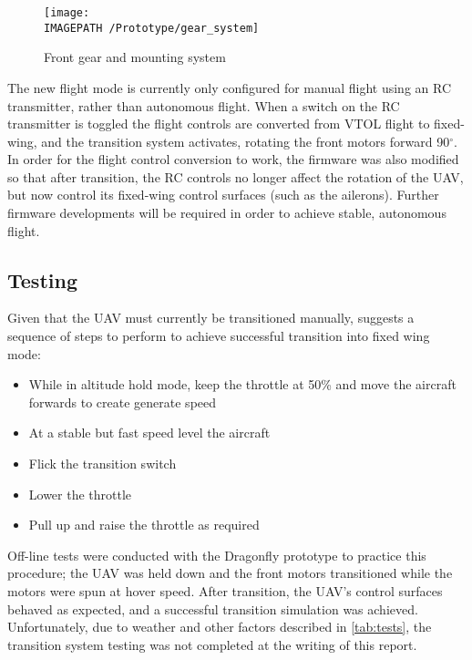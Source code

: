\begin{figure}[!ht]
	\centering
	\texttt{[image: \\IMAGEPATH /Prototype/gear\_system]}
	\caption{Front gear and mounting system}
	\label{fig:gearsys}
\end{figure}

The new flight mode is currently only configured for manual flight using an RC transmitter, rather than autonomous flight. When a switch on the RC transmitter is toggled the flight controls are converted from VTOL flight to fixed-wing, and the transition system activates, rotating the front motors forward 90$^\circ$. In order for the flight control conversion to work, the firmware was also modified so that after transition, the RC controls no longer affect the rotation of the UAV, but now control its fixed-wing control surfaces (such as the ailerons). Further firmware developments will be required in order to achieve stable, autonomous flight.\\

\subsection{Testing}
Given that the UAV must currently be transitioned manually, \cite{ref:fireflyinstruction} suggests a sequence of steps to perform to achieve successful transition into fixed wing mode: 
\begin{itemize}
\item While in altitude hold mode, keep the throttle at 50\% and move the aircraft forwards to create generate speed
\item At a stable but fast speed level the aircraft
\item Flick the transition switch 
\item Lower the throttle
\item Pull up and raise the throttle as required		
\end{itemize}

Off-line tests were conducted with the Dragonfly prototype to practice this procedure; the UAV was held down and the front motors transitioned while the motors were spun at hover speed. After transition, the UAV's control surfaces behaved as expected, and a successful transition simulation was achieved. Unfortunately, due to weather and other factors described in \ref{tab:tests}, the transition system testing was not completed at the writing of this report.
